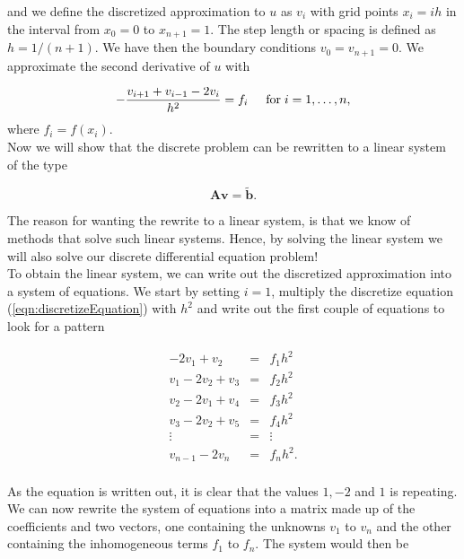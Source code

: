 \documentclass{article}
\begin{document}
and we define the discretized approximation  to $u$ as $v_i$  with 
grid points $x_i=ih$   in the interval from $x_0=0$ to $x_{n+1}=1$.
The step length or spacing is defined as $h=1/(n+1)$. 
We have then the boundary conditions $v_0 = v_{n+1} = 0$.
We  approximate the second
derivative of $u$ with

\begin{equation}
-\frac{v_{i+1}+v_{i-1}-2v_i}{h^2} = f_i  \hspace{0.5cm} \mathrm{for} \hspace{0.1cm} i=1,\dots, n,
\label{eqn:discretizeEquation}
\end{equation}
where $f_i=f(x_i)$. \\

Now we will show that the discrete problem can be rewritten to a linear system of the type 

\begin{equation*}
\mathbf{A}\mathbf{v} = \tilde{\mathbf{b}}.
\end{equation*}

The reason for wanting the rewrite to a linear system, is that we know of methods that solve such linear systems. Hence, by solving the linear system we will also solve our discrete differential equation problem!\\

To obtain the linear system, we can write out the discretized approximation into a system of equations. We start by setting $i=1$, multiply the discretize equation (\ref{eqn:discretizeEquation}) with $h^2$ and write out the first couple of equations to look for a pattern

\begin{eqnarray}
\nonumber
-2v_1 + v_2 &=& f_1h^2 \\ \nonumber
v_1 - 2v_2 +v_3 &=& f_2h^2 \\ \nonumber
v_2 - 2v_1 +v_4 &=& f_3h^2 \\ \nonumber
v_3 - 2v_2 +v_5 &=& f_4h^2 \\ \nonumber
\vdots &=& \vdots \\ \nonumber
v_{n-1} - 2v_n &=& f_nh^2. \\ \nonumber
\end{eqnarray}

As the equation is written out, it is clear that the values $1, -2$ and $1$ is repeating. We can now rewrite the system of equations into a matrix made up of the coefficients and two vectors, one containing the unknowns $v_1$ to $v_{n}$ and the other containing the inhomogeneous terms $f_1$ to $f_{n}$. The system would then be 
\end{document}
